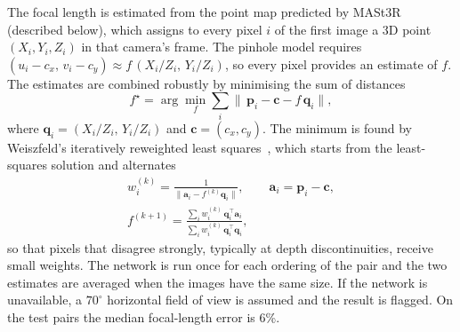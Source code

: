 \documentclass[10pt,a4paper,twocolumn]{article}
\begin{document}
The focal length is estimated from the point map predicted by MASt3R~\cite{mast3r} (described below), which assigns to every pixel $i$ of the first image a 3D point $(X_i,Y_i,Z_i)$ in that camera's frame. The pinhole model requires $(u_i-c_x,\,v_i-c_y)\approx f\,(X_i/Z_i,\,Y_i/Z_i)$, so every pixel provides an estimate of $f$. The estimates are combined robustly by minimising the sum of distances
\begin{equation}
  f^\star = \arg\min_f \sum_i \big\|\,\mathbf{p}_i - \mathbf{c} - f\,\mathbf{q}_i\big\|,
\end{equation}
where $\mathbf{q}_i = (X_i/Z_i,\,Y_i/Z_i)$ and $\mathbf{c}=(c_x,c_y)$. The minimum is found by Weiszfeld's iteratively reweighted least squares~\cite{weiszfeld,dust3r}, which starts from the least-squares solution and alternates
\begin{gather}
  w_i^{(k)} = \frac{1}{\|\mathbf{a}_i - f^{(k)}\mathbf{q}_i\|},\qquad \mathbf{a}_i=\mathbf{p}_i-\mathbf{c},\\
  f^{(k+1)} = \frac{\sum_i w_i^{(k)}\,\mathbf{q}_i^\top\mathbf{a}_i}{\sum_i w_i^{(k)}\,\mathbf{q}_i^\top\mathbf{q}_i},
\end{gather}
so that pixels that disagree strongly, typically at depth discontinuities, receive small weights. The network is run once for each ordering of the pair and the two estimates are averaged when the images have the same size. If the network is unavailable, a $70^\circ$ horizontal field of view is assumed and the result is flagged. On the test pairs the median focal-length error is 6\%.
\end{document}
